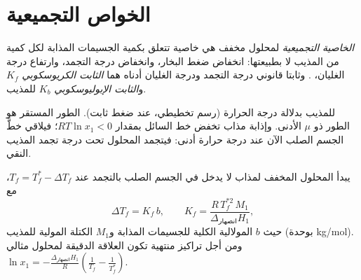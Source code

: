 \section{الخواص التجميعية}

\begin{definition}\label{def:b2:chemical-potential:colligative}
\emph{الخاصية التجميعية} لمحلول مخفف هي
خاصية تتعلق بكمية الجسيمات المذابة لكل كمية من المذيب لا بطبيعتها:
انخفاض ضغط البخار، وانخفاض درجة التجمد، وارتفاع درجة الغليان، . وثابتا قانوني درجة التجمد ودرجة الغليان أدناه هما
\emph{الثابت الكريوسكوبي} $K_f$
و\emph{الثابت الإبوليوسكوبي} $K_b$
للمذيب.
\end{definition}

\begin{omfigure}

{\small {} للمذيب بدلالة درجة الحرارة (رسم تخطيطي، عند ضغط
ثابت). الطور المستقر هو الطور ذو $\mu$ الأدنى. وإذابة مذاب تخفض خط السائل
بمقدار $RT\ln x_1 < 0$؛ فيلاقي خطَّ الجسم الصلب الآن عند درجة حرارة أدنى:
فيتجمد المحلول تحت درجة تجمد المذيب النقي.}
\end{omfigure}

\begin{theorem}\label{thm:b2:chemical-potential:cryoscopy}
يبدأ المحلول المخفف لمذاب لا يدخل في الجسم الصلب بالتجمد
عند $T_f = T_f^* - \Delta T_f$، مع
\[
  \Delta T_f = K_f\,b, \qquad K_f = \frac{R\,T_f^{*2}\,M_1}{\Delta_{\text{انصهار}}H_1} ,
\]
حيث $b$ المولالية الكلية للجسيمات المذابة و$M_1$ الكتلة المولية
للمذيب (بوحدة \unit{kg/mol}). ومن أجل تراكيز منتهية تكون العلاقة الدقيقة
لمحلول مثالي $\ln x_1 = -\frac{\Delta_{\text{انصهار}}H_1}{R}
\left(\frac{1}{T_f} - \frac{1}{T_f^*}\right)$.
\end{theorem}

